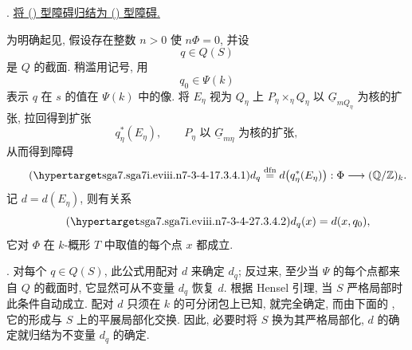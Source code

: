 

\medskip
\noindent {}. \underline{将 () 型障碍归结为 () 型障碍.}

为明确起见, 假设存在整数 $n>0$ 使 $n\Phi=0$, 并设
\[
 q\in Q(S)
\]
是 $Q$ 的截面. 稍滥用记号, 用
\[
 q_0\in\Psi(k)
\]
表示 $q$ 在 $s$ 的值在 $\Psi(k)$ 中的像. 将 $E_\eta$ 视为 $Q_\eta$ 上 $P_\eta\times_\eta Q_\eta$ 以 $\underline G_{mQ_\eta}$ 为核的扩张, 拉回得到扩张
\[
 q_\eta^*(E_\eta),\qquad
 \text{$P_\eta$ 以 $\underline G_{m\eta}$ 为核的扩张},
\]
从而得到障碍
\begin{equation}\tag{\SGARefTarget{sga7.sga7i.eviii.n7-3-4-1}{7.3.4.1}}
 d_q\overset{\mathrm{dfn}}{=}
 d\bigl(q_\eta^*(E_\eta)\bigr):
 \Phi\longrightarrow(\mathbb Q/\mathbb Z)_k.
\end{equation}
记 $d=d(E_\eta)$, 则有关系
\begin{equation}\tag{\SGARefTarget{sga7.sga7i.eviii.n7-3-4-2}{7.3.4.2}}
 d_q(x)=d(x,q_0),
\end{equation}
它对 $\Phi$ 在 $k$-概形 $T$ 中取值的每个点 $x$ 都成立.

\smallskip
\noindent {}. 对每个 $q\in Q(S)$, 此公式用配对 $d$ 来确定 $d_q$; 反过来, 至少当 $\Psi$ 的每个点都来自 $Q$ 的截面时, 它显然可从不变量 $d_q$ 恢复 $d$. 根据 Hensel 引理, 当 $S$ 严格局部时此条件自动成立. 配对 $d$ 只须在 $k$ 的可分闭包上已知, 就完全确定, 而由下面的 , 它的形成与 $S$ 上的平展局部化交换. 因此, 必要时将 $S$ 换为其严格局部化, $d$ 的确定就归结为不变量 $d_q$ 的确定.

